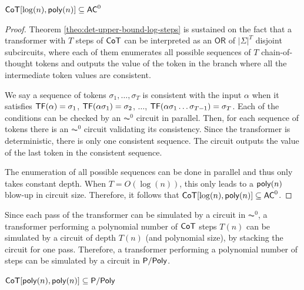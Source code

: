 \begin{theorem}\label{theo:det-upper-bound-log-steps}
    $\mathsf{CoT}[\log(n), \mathsf{poly}(n)] \subseteq \mathsf{AC}^0$
\end{theorem}

\begin{proof}
    Theorem \ref{theo:det-upper-bound-log-steps} is sustained on the fact that a transformer with $T$ steps of $\mathsf{CoT}$ can be interpreted as an $\mathsf{OR}$ of $|\Sigma|^T$ disjoint subcircuits, where each of them enumerates all possible sequences of $T$ chain-of-thought tokens and outputs the value of the token in the branch where all the intermediate token values are consistent. 
    
    We say a sequence of tokens $\sigma_1, \dots, \sigma_T$ is consistent with the input $\alpha$ when it satisfies $\mathsf{TF}(\alpha) = \sigma_1$, $\mathsf{TF}(\alpha \sigma_1) = \sigma_2$, $\dots$, $\mathsf{TF}(\alpha \sigma_1 \dots \sigma_{T-1}) = \sigma_{T}$.
    Each of the conditions can be checked by an $\AC^0$ circuit in parallel.
    Then, for each sequence of tokens there is an $\AC^0$ circuit validating its consistency.
    Since the transformer is deterministic, there is only one consistent sequence.
    The circuit outputs the value of the last token in the consistent sequence.
    
    The enumeration of all possible sequences can be done in parallel and thus only takes constant depth.
    When $T = O(\log(n))$, this only leads to a $\mathsf{poly}(n)$ blow-up in circuit size.
    Therefore, it follows that $\mathsf{CoT}[\log(n), \mathsf{poly}(n)] \subseteq \mathsf{AC}^0$.
\end{proof}

\medskip

Since each pass of the transformer can be simulated by a circuit in $\AC^0$, a transformer performing a polynomial number of $\mathsf{CoT}$ steps $T(n)$ can be simulated by a circuit of depth $T(n)$ (and polynomial size), by stacking the circuit for one pass.
Therefore, a transformer performing a polynomial number of steps can be simulated by a circuit in $\mathsf{P/Poly}$.

\begin{corollary}\label{det-poly-steps-in-ppoly}
    $\mathsf{CoT}[\mathsf{poly}(n), \mathsf{poly}(n)] \subseteq \mathsf{P/Poly}$
\end{corollary}